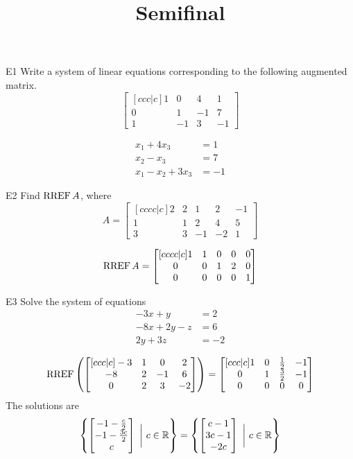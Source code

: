 \documentclass{sbgLAsemi}
\title{Semifinal}
\begin{document}
\begin{problem}{E1}
Write a system of linear equations corresponding to the following
augmented matrix.
\[
\begin{bmatrix}[ccc|c]
1 & 0 & 4 & 1 \\
0 & 1 & -1 & 7 \\
1 & -1 & 3 & -1
\end{bmatrix}
\]
\end{problem}
\begin{solution}
\begin{align*}
x_1+4x_3 &= 1 \\
x_2-x_3 &= 7 \\
x_1-x_2+3x_3 &= -1
\end{align*}
\end{solution}
\begin{problem}{E2}
Find \(\operatorname{RREF} A\), where
\[
  A =
  \begin{bmatrix}[cccc|c]
    2 & 2 & 1 & 2 & -1 \\
    1 & 1 & 2 & 4 & 5 \\
    3 & 3 & -1 & -2 & 1
  \end{bmatrix}
\]
\end{problem}
\begin{solution}
\[
  \operatorname{RREF} A =
  \begin{bmatrix}[cccc|c]
    1 & 1 & 0 & 0 & 0 \\
    0 & 0 & 1 & 2 & 0 \\
    0 & 0 & 0 & 0 & 1
  \end{bmatrix}
\]
\end{solution}
\begin{problem}{E3}
Solve the system of equations
\begin{align*}
-3x +y &= 2\\
-8x+2y-z &= 6 \\
2y+3z &= -2
\end{align*}


\end{problem}

\begin{solution}
$$\operatorname{RREF}\left(\begin{bmatrix}[ccc|c] -3 & 1 & 0 & 2 \\ -8 & 2 & -1 & 6 \\ 0 & 2 & 3 & -2 \end{bmatrix} \right) = \begin{bmatrix}[ccc|c] 1 & 0 & \frac{1}{2} & -1 \\ 0 & 1 & \frac{3}{2} & -1 \\ 0 & 0 & 0 & 0 \end{bmatrix}$$
The solutions are $$\left\{ \begin{bmatrix} -1-\frac{c}{2} \\ -1-\frac{3c}{2} \\ c \end{bmatrix}\ \bigg|\ c\in \mathbb{R}\right\} = \left\{ \begin{bmatrix} c-1 \\ 3c-1 \\ -2c  \end{bmatrix}\ \bigg|\ c\in \mathbb{R}\right\}$$
\end{solution}
\end{document}
